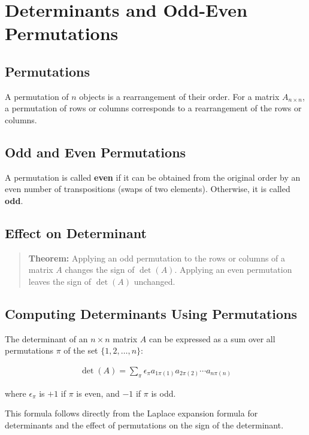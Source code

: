 \documentclass{article}
\begin{document}
%
\section{Determinants and Odd-Even Permutations}

\subsection{Permutations}

A permutation of $n$ objects is a rearrangement of their order. For a matrix $A_{n\times n}$, a permutation of rows or columns corresponds to a rearrangement of the rows or columns.

\subsection{Odd and Even Permutations}

A permutation is called \textbf{even} if it can be obtained from the original order by an even number of transpositions (swaps of two elements). Otherwise, it is called \textbf{odd}.

\subsection{Effect on Determinant}

\begin{quotation}
\noindent\textbf{Theorem:} Applying an odd permutation to the rows or columns of a matrix $A$ changes the sign of $\det(A)$. Applying an even permutation leaves the sign of $\det(A)$ unchanged.
\end{quotation}

\subsection{Computing Determinants Using Permutations}

The determinant of an $n\times n$ matrix $A$ can be expressed as a sum over all permutations $\pi$ of the set $\{1, 2, \ldots, n\}$:

\begin{align*}
\det(A) = \sum_{\pi} \epsilon_{\pi} a_{1\pi(1)}a_{2\pi(2)}\cdots a_{n\pi(n)}
\end{align*}

where $\epsilon_{\pi}$ is $+1$ if $\pi$ is even, and $-1$ if $\pi$ is odd.

This formula follows directly from the Laplace expansion formula for determinants and the effect of permutations on the sign of the determinant.
\end{document}
